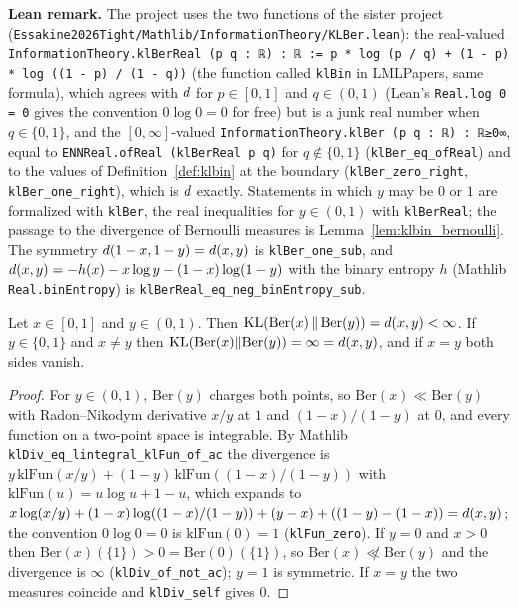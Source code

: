 \textbf{Lean remark.} The project uses the two functions of the sister project
(\texttt{Essakine2026Tight/Mathlib/InformationTheory/KLBer.lean}): the real-valued
\texttt{InformationTheory.klBerReal (p q : ℝ) : ℝ := p * log (p / q) + (1 - p) * log ((1 - p) / (1 - q))}
(the function called \texttt{klBin} in LMLPapers, same formula), which agrees with $d$ for
$p \in [0,1]$ and $q \in (0,1)$ (Lean's \texttt{Real.log 0 = 0} gives the convention $0\log 0 = 0$
for free) but is a junk real number when $q \in \{0, 1\}$, and the $[0,\infty]$-valued
\texttt{InformationTheory.klBer (p q : ℝ) : ℝ≥0∞}, equal to \texttt{ENNReal.ofReal (klBerReal p q)}
for $q \notin \{0, 1\}$ (\texttt{klBer\_eq\_ofReal}) and to the values of
Definition~\ref{def:klbin} at the boundary (\texttt{klBer\_zero\_right}, \texttt{klBer\_one\_right}),
which is $d$ exactly. Statements in which $y$ may be $0$ or $1$ are formalized with
\texttt{klBer}, the real inequalities for $y \in (0, 1)$ with \texttt{klBerReal}; the passage to
the divergence of Bernoulli measures is Lemma~\ref{lem:klbin_bernoulli}. The symmetry
$d(1-x, 1-y) = d(x, y)$ is \texttt{klBer\_one\_sub}, and
$d(x,y) = -h(x) - x\log y - (1-x)\log(1-y)$ with the binary entropy
$h$ (Mathlib \texttt{Real.binEntropy}) is \texttt{klBerReal\_eq\_neg\_binEntropy\_sub}.

\begin{lemma}\label{lem:klbin_bernoulli}
\leanok
{}
Let $x \in [0, 1]$ and $y \in (0, 1)$. Then
$\mathrm{KL}(\mathrm{Ber}(x)\,\|\,\mathrm{Ber}(y)) = d(x, y) < \infty$. If $y \in \{0, 1\}$ and
$x \ne y$ then $\mathrm{KL}(\mathrm{Ber}(x)\|\mathrm{Ber}(y)) = \infty = d(x, y)$, and if $x = y$
both sides vanish.
\end{lemma}

\begin{proof}
\leanok
For $y \in (0, 1)$, $\mathrm{Ber}(y)$ charges both points, so $\mathrm{Ber}(x) \ll \mathrm{Ber}(y)$
with Radon--Nikodym derivative $x/y$ at $1$ and $(1-x)/(1-y)$ at $0$, and every function on a
two-point space is integrable. By Mathlib \texttt{klDiv\_eq\_lintegral\_klFun\_of\_ac} the
divergence is $y\,\mathrm{klFun}(x/y) + (1-y)\,\mathrm{klFun}((1-x)/(1-y))$ with
$\mathrm{klFun}(u) = u\log u + 1 - u$, which expands to
$x\log(x/y) + (1-x)\log((1-x)/(1-y)) + (y - x) + ((1-y) - (1-x)) = d(x, y)$; the
convention $0\log 0 = 0$ is $\mathrm{klFun}(0) = 1$ (\texttt{klFun\_zero}). If $y = 0$ and
$x > 0$ then $\mathrm{Ber}(x)(\{1\}) > 0 = \mathrm{Ber}(0)(\{1\})$, so
$\mathrm{Ber}(x) \not\ll \mathrm{Ber}(y)$ and the divergence is $\infty$
(\texttt{klDiv\_of\_not\_ac}); $y = 1$ is symmetric. If $x = y$ the two measures coincide and
\texttt{klDiv\_self} gives $0$.
\end{proof}

